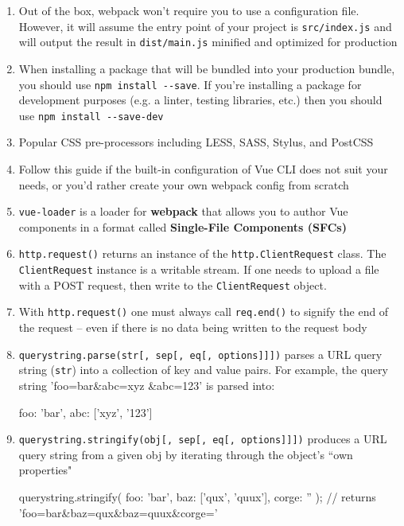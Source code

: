 \documentclass[a4paper,12pt]{article}
\begin{document}
\begin{enumerate}
\item Out of the box, webpack won't require you to use a configuration file. However, it will assume the entry point of your project is \verb|src/index.js| and will output the result in \verb|dist/main.js| minified and optimized for production

\item When installing a package that will be bundled into your production bundle, you should use \verb|npm install --save|. If you're installing a package for development purposes (e.g. a linter, testing libraries, etc.) then you should use \verb|npm install --save-dev|

\item Popular CSS pre-processors including LESS, SASS, Stylus, and PostCSS

\item Follow this guide if the built-in configuration of Vue CLI does not suit your needs, or you'd rather create your own webpack config from scratch
	
\item \verb|vue-loader| is a loader for \textbf{webpack} that allows you to author Vue components in a format called\textbf{ Single-File Components (SFCs)}
	
\item \verb|http.request()| returns an instance of the \verb|http.ClientRequest| class. The\\ \verb|ClientRequest| instance is a writable stream. If one needs to upload a file with a POST request, then write to the \verb|ClientRequest| object.	
	
\item  With \verb|http.request()| one must always call \verb|req.end()| to signify the end of the request -- even if there is no data being written to the request body	
	

\item \verb|querystring.parse(str[, sep[, eq[, options]]])| parses a URL query string (\verb|str|) into a collection of key and value pairs. For example, the query string 'foo=bar\&abc=xyz \&abc=123' is parsed into:
\begin{jscode}
{
	foo: 'bar',
	abc: ['xyz', '123']
}	
\end{jscode}

\item \verb|querystring.stringify(obj[, sep[, eq[, options]]])| produces a URL query string from a given obj by iterating through the object's ``own properties"
\begin{jscode}
querystring.stringify({ foo: 'bar', baz: ['qux', 'quux'], corge: '' });
// returns 'foo=bar&baz=qux&baz=quux&corge='	
\end{jscode}


\end{enumerate}
\end{document}
